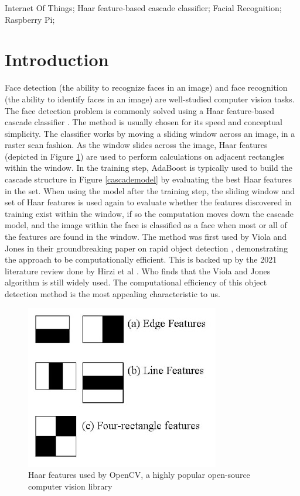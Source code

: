 \documentclass[conference]{IEEEtran}
\begin{document}
\begin{IEEEkeywords}
Internet Of Things; Haar feature-based cascade classifier; Facial Recognition; Raspberry Pi;
\end{IEEEkeywords}



\section{Introduction}
Face detection (the ability to recognize faces in an image) and face recognition (the ability to identify faces in an image) are well-studied computer vision tasks. The face detection problem is commonly solved using a Haar feature-based cascade classifier \cite{FiveCuimei}. The method is usually chosen for its speed and conceptual simplicity. The classifier works by moving a sliding window across an image, in a raster scan fashion. As the window slides across the image, Haar features (depicted in Figure \ref{haarfeature}) are used to perform calculations on adjacent rectangles within the window. In the training step, AdaBoost is typically used \cite{TenAras,ElevenNiranjan} to build the cascade structure in Figure \ref{cascademodel} by evaluating the best Haar features in the set. When using the model after the training step, the sliding window and set of Haar features is used again to evaluate whether the features discovered in training exist within the window, if so the computation moves down the cascade model, and the image within the face is classified as a face when most or all of the features are found in the window. The method was first used by Viola and Jones in their groundbreaking paper on rapid object detection \cite{SixViola}, demonstrating the approach to be computationally efficient. This is backed up by the 2021 literature review done by Hirzi et al \cite{NineHirzi}. Who finds that the Viola and Jones algorithm is still widely used. The computational efficiency of this object detection method is the most appealing characteristic to us.

\begin{figure}[htbp]
\centerline{\includegraphics[scale=0.75]{haarfeature.jpg}}
\caption{Haar features used by OpenCV, a highly popular open-source computer vision library}
\label{haarfeature}
\end{figure}
\end{document}

